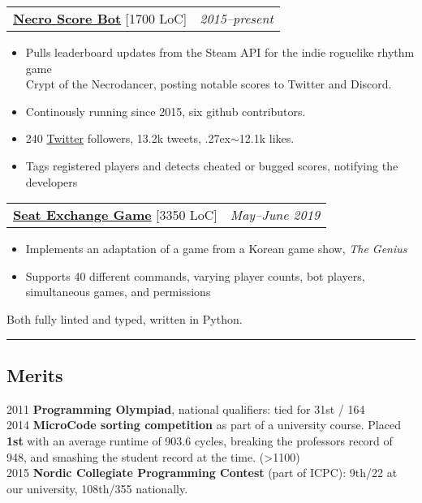 \documentclass[10pt,letterpaper]{article}
\makeatletter
\newcommand{\headerrow}[2]
{\begin{tabular*}{\linewidth}{l@{\extracolsep{\fill}}r}
    #1 &
    #2 \\
\end{tabular*}}
\makeatother
\begin{document}
\headerrow
{\href{https://github.com/jakkdl/necro\_score\_bot}{\textbf{Necro Score Bot}} [1700 LoC]}
{\emph{2015--present}}
\begin{itemize}[noitemsep, topsep=1pt]
    \item Pulls leaderboard updates from the Steam API for the indie roguelike
        rhythm game \\ Crypt of the Necrodancer, posting notable scores
        to Twitter and Discord.
    \item Continously running since 2015, six github contributors.
    \item 240 \href{(https://twitter.com/necro\_score\_bot}{Twitter} followers, 13.2k tweets, {\raise.27ex\hbox{$\scriptstyle\sim$}}12.1k likes.
    \item Tags registered players and detects cheated or bugged scores, notifying the
        developers
\end{itemize}
\vspace{0.3em}
\headerrow
    {\href{https://github.com/jakkdl/seat\_exchange}{\textbf{Seat Exchange Game}} [3350 LoC]}
    {\emph{May--June 2019}}
\begin{itemize}[noitemsep, topsep=1pt]
    \item Implements an adaptation of a game from a Korean game show, \emph{The
        Genius}
    \item Supports 40 different commands, varying player counts,
        bot players, simultaneous games, and permissions
\end{itemize}
\vspace{0.2em}
Both fully linted and typed, written in Python. \\


\hrule
\vspace{-0.4em}
\subsection*{Merits}

2011 \textbf{Programming Olympiad}, national qualifiers: tied for 31st / 164 \\
2014 \textbf{MicroCode sorting competition} as part of a university course. Placed \textbf{1st} with an average runtime of 903.6 cycles, breaking the professors record of 948, and smashing the student record at the time. (>1100) \\
2015 \textbf{Nordic Collegiate Programming Contest} (part of ICPC): 9th/22 at our university, 108th/355 nationally.
\vspace{0.5em}
\end{document}
